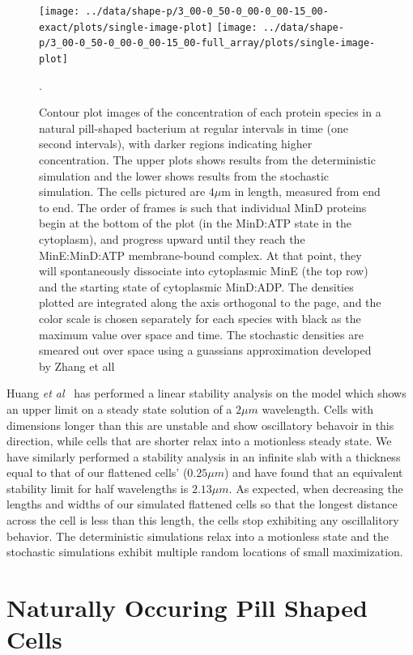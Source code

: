 \documentclass[letterpaper,twocolumn,amsmath,amssymb,pre]{revtex4-1}
\newcommand\micron{\ensuremath{\mu\text{m}}}
\begin{document}
\begin{figure}
  \texttt{[image: ../data/shape-p/3\_00-0\_50-0\_00-0\_00-15\_00-exact/plots/single-image-plot]}
  \texttt{[image: ../data/shape-p/3\_00-0\_50-0\_00-0\_00-15\_00-full\_array/plots/single-image-plot]}
  \caption{Contour plot images of the concentration of each protein
    species in a natural pill-shaped bacterium at regular intervals in
    time (one second intervals), with darker regions indicating higher
    concentration. The upper plots shows results from the
    deterministic simulation and the lower shows results from the
    stochastic simulation.  The cells pictured are $4\micron$ in
    length, measured from end to end.  The order of frames is such
    that individual MinD proteins begin at the bottom of the plot (in
    the MinD:ATP state in the cytoplasm), and progress upward until
    they reach the MinE:MinD:ATP membrane-bound complex.  At that
    point, they will spontaneously dissociate into cytoplasmic MinE
    (the top row) and the starting state of cytoplasmic MinD:ADP.  The
    densities plotted are integrated along the axis orthogonal to the
    page, and the color scale is chosen separately for each species
    with black as the maximum value over space and time.  The
    stochastic densities are smeared out over space using a guassians
    approximation developed by Zhang et all~\cite{zhang2007gaussian}}.
  \label{image-p}
\end{figure}

Huang \emph{et al}~\cite{huang2003dynamic} has performed a linear
stability analysis on the model which shows an upper limit on a steady
state solution of a $2\mu m$ wavelength.  Cells with dimensions longer
than this are unstable and show oscillatory behavoir in this
direction, while cells that are shorter relax into a motionless steady
state.  We have similarly performed a stability analysis in an
infinite slab with a thickness equal to that of our flattened cells'
($0.25\mu m$) and have found that an equivalent stability limit for
half wavelengths is $2.13\mu m$. As expected, when decreasing the
lengths and widths of our simulated flattened cells so that the
longest distance across the cell is less than this length, the cells
stop exhibiting any oscillalitory behavior.  The deterministic
simulations relax into a motionless state and the stochastic
simulations exhibit multiple random locations of small maximization.

\section{Naturally Occuring Pill Shaped Cells}
\end{document}
